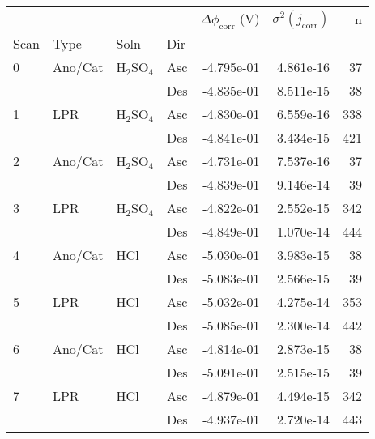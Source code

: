 \begin{tabular}{llllrrr}
\toprule
  &     &     &     &  $\Delta \phi_{\text{corr}}$ (V) &  $\sigma^2(j_{\text{corr}})$ &    n \\
Scan & Type & Soln & Dir &                                  &                              &      \\
\midrule
0 & Ano/Cat & H$_2$SO$_4$ & Asc &                       -4.795e-01 &                    4.861e-16 &   37 \\
  &     &     & Des &                       -4.835e-01 &                    8.511e-15 &   38 \\
1 & LPR & H$_2$SO$_4$ & Asc &                       -4.830e-01 &                    6.559e-16 &  338 \\
  &     &     & Des &                       -4.841e-01 &                    3.434e-15 &  421 \\
2 & Ano/Cat & H$_2$SO$_4$ & Asc &                       -4.731e-01 &                    7.537e-16 &   37 \\
  &     &     & Des &                       -4.839e-01 &                    9.146e-14 &   39 \\
3 & LPR & H$_2$SO$_4$ & Asc &                       -4.822e-01 &                    2.552e-15 &  342 \\
  &     &     & Des &                       -4.849e-01 &                    1.070e-14 &  444 \\
4 & Ano/Cat & HCl & Asc &                       -5.030e-01 &                    3.983e-15 &   38 \\
  &     &     & Des &                       -5.083e-01 &                    2.566e-15 &   39 \\
5 & LPR & HCl & Asc &                       -5.032e-01 &                    4.275e-14 &  353 \\
  &     &     & Des &                       -5.085e-01 &                    2.300e-14 &  442 \\
6 & Ano/Cat & HCl & Asc &                       -4.814e-01 &                    2.873e-15 &   38 \\
  &     &     & Des &                       -5.091e-01 &                    2.515e-15 &   39 \\
7 & LPR & HCl & Asc &                       -4.879e-01 &                    4.494e-15 &  342 \\
  &     &     & Des &                       -4.937e-01 &                    2.720e-14 &  443 \\
\bottomrule
\end{tabular}
